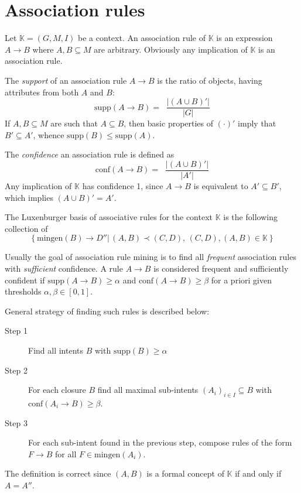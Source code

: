 \documentclass[a4paper]{article}
\newcommand{\obj}[1]{{\left\{ #1 \right \}}}
\newcommand{\clo}[1]{{\left [ #1 \right ]}}
\newcommand{\brac}[1]{{\left ( #1 \right )}}
\newcommand{\induc}[1]{{\left . #1 \right \vert}}
\newcommand{\abs}[1]{{\left | #1 \right |}}
\newcommand{\Ctx}{\mathbb{K}}
\newcommand{\supp}{\text{supp}}
\newcommand{\conf}{\text{conf}}
\newcommand{\defn}{\mathop{\overset{\Delta}{=}}\nolimits}
\begin{document}

\section{Association rules} %
\label{sec:association_rules}

Let $\Ctx=\brac{G,M,I}$ be a context. An association rule of $\Ctx$ is an expression $A\to B$ where $A,B\subseteq M$ are arbitrary. Obviously any implication of $\Ctx$ is an association rule.

The \emph{support} of an association rule $A\to B$ is the ratio of objects, having attributes from both $A$ and $B$:\[\supp\brac{A\to B} = \defn \frac{\abs{\brac{A\cup B}'}}{\abs{G}}\] If $A,B\subseteq M$ are such that $A\subseteq B$, then basic properties of ${(\cdot)}'$ imply that $B'\subseteq A'$, whence $\supp(B)\leq \supp(A)$.

The \emph{confidence} an association rule is defined as \[\conf\brac{A\to B} = \defn \frac{\abs{\brac{A\cup B}'}}{\abs{A'}}\] Any implication of $\Ctx$ has confidence 1, since $A\to B$ is equivalent to $A'\subseteq B'$, which implies $\brac{A\cup B}' = A'$.

The Luxenburger basis of associative rules for the context $\Ctx$ is the following collection of \[\obj{\induc{ \text{mingen}(B)\to D'' }\,(A,B)\prec(C,D),\,(C,D),(A,B)\in \Ctx}\]

Usually the goal of association rule mining is to find all \emph{frequent} association rules with \emph{sufficient} confidence. A rule $A\to B$ is considered frequent and sufficiently confident if $\supp\brac{A\to B}\geq \alpha$ and $\conf\brac{A\to B}\geq \beta$ for a priori given thresholds $\alpha,\beta\in \clo{0,1}$.

General strategy of finding such rules is described below:
\begin{description}
	\item[Step 1] Find all intents $B$ with $\supp(B)\geq \alpha$
	\item[Step 2] For each closure $B$ find all maximal sub-intents $\brac{A_i}_{i\in I}\subseteq B$ with $\conf\brac{A_i\to B}\geq \beta$.
	\item[Step 3] For each sub-intent found in the previous step, compose rules of the form $F\to B$ for all $F\in \text{mingen}(A_i)$.
\end{description}

The definition is correct since $(A,B)$ is a formal concept of $\Ctx$ if and only if $A=A''$.
\end{document}
